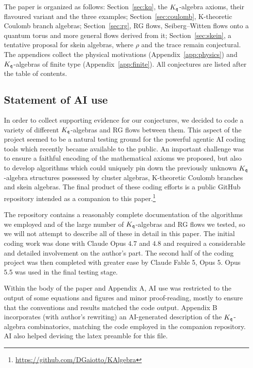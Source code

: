 \documentclass[12pt]{amsart}
\begin{document}
The paper is organized as follows: Section~\ref{sec:kq}, the $K_{\mathfrak{q}}$-algebra axioms, their flavoured variant and the three examples; Section~\ref{sec:coulomb}, K-theoretic Coulomb branch algebras; Section~\ref{sec:rg}, RG flows, Seiberg--Witten flows onto a quantum torus and more general flows derived from it; Section~\ref{sec:skein}, a tentative proposal for skein algebras, where $\rho$ and the trace remain conjectural. The appendices collect the physical motivations (Appendix~\ref{app:physics}) and $K_{\mathfrak{q}}$-algebras of finite type (Appendix~\ref{app:finite}). All conjectures are listed after the table of contents.

\subsection*{Statement of AI use}
In order to collect supporting evidence for our conjectures, we decided to code a variety of different $K_{\mathfrak{q}}$-algebras and RG flows between them. This aspect of the project seemed to be a natural testing ground for the powerful agentic AI coding tools which recently became available to the public. An important challenge was to ensure a faithful encoding of the mathematical axioms we proposed,
but also to develop algorithms which could uniquely pin down the previously unknown $K_{\mathfrak{q}}$-algebra structures possessed by cluster algebras, K-theoretic Coulomb branches and skein algebras. 
The final product of these coding efforts is a public GitHub repository intended as a companion to this paper.\footnote{\url{https://github.com/DGaiotto/KAlgebra}}

The repository contains a reasonably complete documentation of the algorithms we employed and of the large number of $K_{\mathfrak{q}}$-algebras and RG flows we tested, so we will not attempt to describe all of these in detail in this paper. 
The initial coding work was done with Claude Opus $4.7$ and $4.8$ and required a considerable and detailed involvement on the author's part. The second half of the coding project was then completed with greater ease by Claude Fable 5, Opus 5. Opus 5.5 was used in the final testing stage. 

Within the body of the paper and Appendix A, AI use was restricted to the output of some equations and figures and minor proof-reading, mostly to ensure that the conventions and results matched the 
code output. Appendix B incorporates (with author's rewriting) an AI-generated description of the $K_{\mathfrak{q}}$-algebra combinatorics, matching the code employed in the companion repository. AI also helped devising the latex preamble for this file. 
\end{document}
